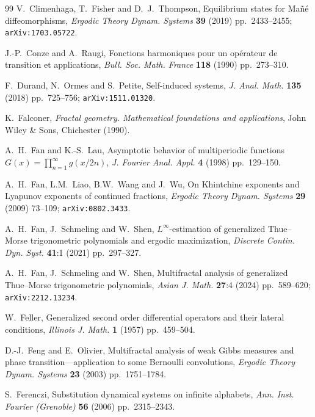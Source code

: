 \documentclass[11pt,reqno]{amsart}
\theoremstyle{plain}
\theoremstyle{definition}
\newcommand{\ts}{\hspace{0.5pt}}
\begin{document}
\begin{thebibliography}{99}
V.~Climenhaga, T.~Fisher and D.~J.~Thompson, 
Equilibrium states for Ma\~{n}\'{e} diffeomorphisms, 
\textit{Ergodic Theory Dynam. Systems} \textbf{39} (2019) pp.~2433--2455;
\texttt{arXiv:1703.05722}.  

 J.-P.~Conze and A.~Raugi, 
 Fonctions harmoniques pour un op\'{e}rateur de transition et applications, 
\textit{Bull. Soc. Math. France} \textbf{118} (1990) pp.~273--310.


F.~Durand, N.~Ormes and S.~Petite, 
Self-induced systems, 
\textit{J. Anal. Math.} \textbf{135} (2018) pp.~725--756;
\texttt{arXiv:1511.01320}.


K.~Falconer, \textit{Fractal geometry. Mathematical foundations and applications},
John Wiley \& Sons, Chichester (1990). 

A.~H.~Fan and K.-S.~Lau, 
Asymptotic behavior of multiperiodic functions $G(x) = \prod_{n =1}^{\infty} g(x/2n)$, 
\textit{J. Fourier Anal. Appl.} \textbf{4} 
(1998) pp.~129--150.

A.~H.~Fan, L.M.~Liao, B.W.~Wang and J.~Wu, 
On Khintchine exponents and Lyapunov exponents of continued fractions,
\textit{Ergodic Theory Dynam. Systems} \textbf{29} (2009) 73--109;
\texttt{arXiv:0802.3433}.

A.~H.~Fan, J.~Schmeling and W.~Shen,
$L^{\infty}$-estimation of generalized Thue{\ts}--Morse trigonometric polynomials and ergodic maximization,
\textit{Discrete Contin. Dyn. Syst.} \textbf{41}:1 (2021) pp.~297--327.

A.~H.~Fan, J.~Schmeling and W.~Shen,
Multifractal analysis of generalized Thue\ts--Morse trigonometric polynomials,
\textit{Asian J. Math.}
\textbf{27}:4 (2024) pp.~589--620;
\texttt{arXiv:2212.13234}.


W.~Feller,
Generalized second order differential operators and their lateral conditions,
\textit{Illinois J. Math.}
\textbf{1} (1957) pp.~459--504.


D.-J.~Feng and E.~Olivier, 
Multifractal analysis of weak Gibbs measures and phase transition---application to some Bernoulli convolutions, 
\textit{Ergodic Theory Dynam. Systems} \textbf{23} (2003) pp.~1751--1784.

S.~Ferenczi, 
Substitution dynamical systems on infinite alphabets, \textit{Ann. Inst. Fourier (Grenoble)} \textbf{56} (2006) pp.~2315--2343.



\end{thebibliography}
\end{document}
